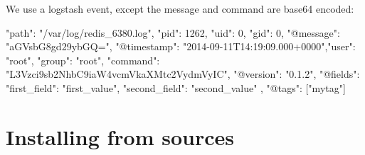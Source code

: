 We use a logstash event, except the message and command are base64 encoded\-: \begin{DoxyVerb}{"path": "/var/log/redis_6380.log", "pid": 1262, "uid": 0, "gid": 0,
"@message": "aGVsbG8gd29ybGQ=",
"@timestamp": "2014-09-11T14:19:09.000+0000","user": "root", "group":
"root",
"command": "L3Vzci9sb2NhbC9iaW4vcmVkaXMtc2VydmVyIC",
"@version": "0.1.2",
"@fields": {
    "first_field": "first_value",
    "second_field": "second_value" },
"@tags": ["mytag"]}
\end{DoxyVerb}


\section*{Installing from sources }

 